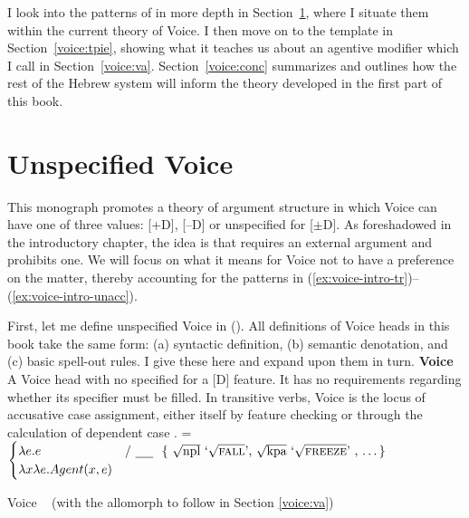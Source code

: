 I look into the patterns of {\tkal} in more depth in Section~\ref{voice:voice}, where I situate them within the current theory of Voice. I then move on to the template {\tpie} in Section~\ref{voice:tpie}, showing what it teaches us about an agentive modifier which I call {\va} in Section~\ref{voice:va}. Section~\ref{voice:conc} summarizes and outlines how the rest of the Hebrew system will inform the theory developed in the first part of this book.

\section{Unspecified Voice} \label{voice:voice}
This monograph promotes a theory of argument structure in which Voice can have one of three values: [+D], [--D] or unspecified for [$\pm$D]. As foreshadowed in the introductory chapter, the idea is that {\vd} requires an external argument and {\vz} prohibits one. We will focus on what it means for Voice not to have a preference on the matter, thereby accounting for the patterns in (\ref{ex:voice-intro-tr})--(\ref{ex:voice-intro-unacc}).

First, let me define unspecified Voice in (\nextx). All definitions of Voice heads in this book take the same form: (a) syntactic definition, (b) semantic denotation, and (c) basic spell-out rules. I give these here and expand upon them in turn.
\pex \textbf{Voice}
	\a A Voice head with no specified for a [D] feature. It has no requirements regarding whether its specifier must be filled. In transitive verbs, Voice is the locus of accusative case assignment, either itself by feature checking \citep{chomsky95} or through the calculation of dependent case \citep{marantz91}.
	\a {} = $\begin{cases}
		\lambda e.e & \text{/ \trace~ \{ \root{npl} `\root{\gsc{FALL}}', \root{kpa} `\root{\gsc{FREEZE}}' , \dots \} }\\
		\lambda x \lambda e.Agent(x,e) & \\
		\end{cases}$

	\a Voice \lra~{\tkal} \hfill  (with the allomorph {\tpie} to follow in Section \ref{voice:va})
\xe

